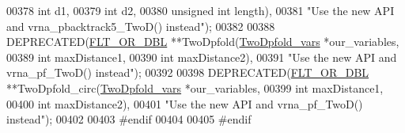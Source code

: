 \begin{DoxyCode}
00378                                  \textcolor{keywordtype}{int}            d1,
00379                                  \textcolor{keywordtype}{int}            d2,
00380                                  \textcolor{keywordtype}{unsigned} \textcolor{keywordtype}{int}   length),
00381           \textcolor{stringliteral}{"Use the new API and vrna\_pbacktrack5\_TwoD() instead"});
00382 
00388 DEPRECATED(\hyperlink{group__data__structures_ga31125aeace516926bf7f251f759b6126}{FLT\_OR\_DBL} **TwoDpfold(\hyperlink{structTwoDpfold__vars}{TwoDpfold\_vars}  *our\_variables,
00389                                   \textcolor{keywordtype}{int}             maxDistance1,
00390                                   \textcolor{keywordtype}{int}             maxDistance2),
00391           \textcolor{stringliteral}{"Use the new API and vrna\_pf\_TwoD() instead"});
00392 
00398 DEPRECATED(\hyperlink{group__data__structures_ga31125aeace516926bf7f251f759b6126}{FLT\_OR\_DBL} **TwoDpfold\_circ(\hyperlink{structTwoDpfold__vars}{TwoDpfold\_vars} *our\_variables,
00399                                        \textcolor{keywordtype}{int}            maxDistance1,
00400                                        \textcolor{keywordtype}{int}            maxDistance2),
00401           \textcolor{stringliteral}{"Use the new API and vrna\_pf\_TwoD() instead"});
00402 
00403 \textcolor{preprocessor}{#endif}
00404 
00405 \textcolor{preprocessor}{#endif}
\end{DoxyCode}
